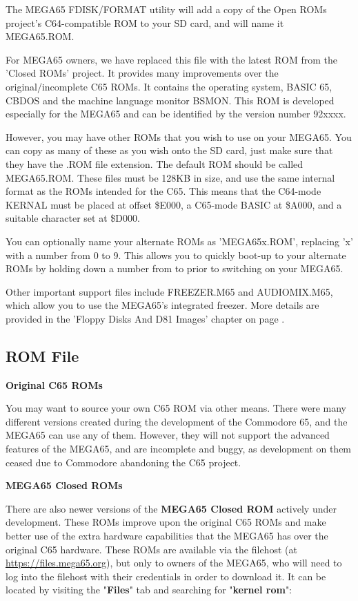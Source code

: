 The MEGA65 FDISK/FORMAT utility will add a copy of the Open ROMs project's C64-compatible ROM
to your SD card, and will name it MEGA65.ROM.

For MEGA65 owners, we have replaced this file with the latest ROM from the 'Closed ROMs'
project. It provides many improvements over the original/incomplete C65 ROMs. It contains
the operating system, BASIC 65, CBDOS and the machine language monitor BSMON.
This ROM is developed especially for the MEGA65 and can be
identified by the version number 92xxxx.

However, you may have other ROMs that you wish to
use on your MEGA65.
You can copy as many of these as you wish onto the
SD card, just make sure that they have the .ROM file extension.  The default ROM
should be called MEGA65.ROM. These files
must be 128KB in size, and use the same internal format as the ROMs
intended for the C65.  This means that the C64-mode KERNAL must be
placed at offset \$E000, a C65-mode BASIC at \$A000, and a suitable
character set at \$D000.

You can optionally name your alternate ROMs as 'MEGA65x.ROM', replacing 'x' with a number from 0 to 9.
This allows you to quickly boot-up to your alternate ROMs by holding down a number from  to  prior
to switching on your MEGA65.

Other important support files include FREEZER.M65 and AUDIOMIX.M65, which
allow you to use the MEGA65's integrated freezer. More details are provided in the 'Floppy Disks And D81 Images'
chapter on page \pageref{cha:freezer}.

\subsection{ROM File}

\textbf{Original C65 ROMs}

You may want to source your own C65 ROM via other means.
There were many different versions created during the development of the Commodore 65,
and the MEGA65 can use any of them.  However, they will not support the advanced
features of the MEGA65, and are incomplete and buggy, as development on them ceased
due to Commodore abandoning the C65 project.

\textbf{MEGA65 Closed ROMs}

There are also newer versions of the \textbf{MEGA65 Closed ROM} actively under development. These ROMs improve upon the original C65 ROMs and make better use of the extra hardware capabilities that the MEGA65 has over the original C65 hardware. These ROMs are available via the filehost (at \url{https://files.mega65.org}), but only to owners of the MEGA65, who will need to log into the filehost with their credentials in order to download it. It can be located by visiting the "\textbf{Files}" tab and searching for "\textbf{kernel rom}":

